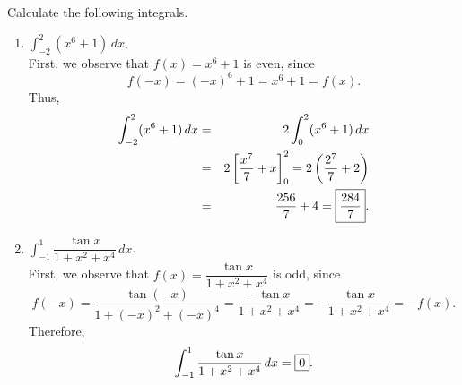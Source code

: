 \documentclass{book}
\newcommand{\dx}{\,dx}
\newcommand{\dint}{\displaystyle \int}
\begin{document}
\begin{Exam} Calculate the following integrals.\\
\begin{enumerate}
\item $\dint_{-2}^2 (x^6+1)\dx$.\\

First, we observe that $f(x) = x^6 + 1$ is even, since
\[f(-x) = (-x)^6+1 = x^6+1 = f(x).\]
Thus,
\begin{eqnarray*}
\int_{-2}^2 (x^6+1)\dx &=& 2\int_0^2 (x^6+1)\dx\\
&=& 2\left[\dfrac{x^7}{7}+x\right]_0^2 = 2\left(\dfrac{2^7}{7}+2\right)\\
&=& \dfrac{256}{7} + 4 = \fbox{$\dfrac{284}{7}$}.
\end{eqnarray*}

\item $\dint_{-1}^1 \dfrac{\tan x}{1+x^2+x^4}\dx$.\\

First, we observe that $f(x) = \dfrac{\tan x}{1 + x^2 + x^4}$ is odd, since
\[f(-x) = \dfrac{\tan(-x)}{1+(-x)^2+(-x)^4}=\dfrac{-\tan x}{1+x^2+x^4} = -\dfrac{\tan x}{1+x^2+x^4} = -f(x).\]
Therefore,
\[\dint_{-1}^1 \dfrac{\tan x}{1+x^2+x^4}\dx = \fbox{$0$}. \]
\end{enumerate}
\end{Exam}

\vfill
{}
\pagebreak
\end{document}

